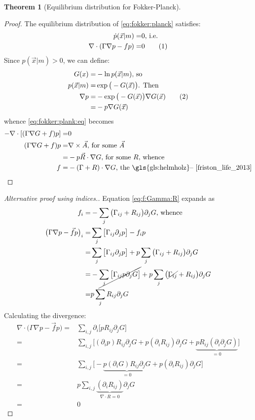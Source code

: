 \documentclass[]{article}
\newcommand\numberthis{\addtocounter{equation}{1}\tag{\theequation}}
\newtheorem{thm}{Theorem}
\begin{document}
\begin{appendices}
\begin{thm}[Equilibrium distribution for Fokker-Planck]
	\end{thm}
	\begin{proof}
		The equilibrium distribution of \eqref{eq:fokker:planck} satisfies:
		\begin{align*}
			\dot{p}(\vec{x}\vert m) =&0 \text{, i.e.}\\
			\nabla \cdot (\Gamma \nabla p -f p)=&0 \numberthis \label{eq:fokker:plank:eq}
		\end{align*}
		Since $	p(\vec{x}\vert m) > 0$, we can define:
		\begin{align*}
			G(x) =& - \ln{}p(\vec{x}\vert m) \text{, so}\\
			p(\vec{x}\vert m) =& \exp \big(-G(\vec{x})\big) \text{. Then}\\
			\nabla p =& - \exp \big(-G(\vec{x})\big) \nabla G(\vec{x}) \numberthis \label{eq:grad:p}\\
			=& - p \nabla G(\vec{x})
		\end{align*}
		whence \eqref{eq:fokker:plank:eq} becomes
		\begin{align*}
			-\nabla \cdot [(\Gamma \nabla G +f)p]=&0\\
			(\Gamma \nabla G +f)p =& \nabla \times \vec{A} \text{, for some $\vec{A}$}\\
			=& -p \vec{R} \cdot \nabla G \text{, for some $R$, whence}\\
			f =& -(\Gamma + R) \cdot \nabla G \text{, the \gls{gls:helmholz}-- \cite[(2.3)]{friston_life_2013}}
		\end{align*}
	\end{proof}
	\begin{proof}[Alternative proof using indices.]
		Equation \eqref{eq:f:Gamma:R} expands as 
		\begin{align*}
			f_i =& - \sum_{j}\big(\Gamma_{ij}+R_{ij}\big)\partial_j G \text{, whence}\\
			\big(\Gamma\nabla p - \vec{f} p\big)_i =& \sum_{j}\big[\Gamma_{ij}\partial_j p\big] -  f_i p\\
			=& \sum_{j}\big[\Gamma_{ij}\partial_j p\big] + p\sum_{j}\big(\Gamma_{ij}+R_{ij}\big)\partial_j G  \\
			=& - \cancel{\sum_{j}\big[\Gamma_{ij}p\partial_j G\big]} + p\sum_{j}\big(\cancel{\Gamma_{ij}}+R_{ij}\big)\partial_j G \\
			=& p\sum_{j}R_{ij}\partial_j G
		\end{align*}
		Calculating the divergence:
		\begin{align*}
			\nabla \cdot \big(\Gamma\nabla p - \vec{f} p\big) =& \sum_{i,j} \partial_i \big[p R_{ij}\partial_j G\big]\\
			=& \sum_{i,j} \big[(\partial_i p) R_{ij}\partial_j G + p (\partial_i  R_{ij})\partial_j G +\underbrace{ p R_{ij}(\partial_i \partial_j G)}_{=0}\big]\\
			=& \sum_{i,j} \big[-\underbrace{p (\partial_i G) R_{ij}\partial_j G}_{=0} + p (\partial_i  R_{ij})\partial_j G \big] \\
			=& p \sum_{i,j} \underbrace{(\partial_i  R_{ij})}_{\nabla\cdot R=0}\partial_j G\\
			=& 0
		\end{align*}
		

\end{proof}
\end{appendices}
\end{document}
